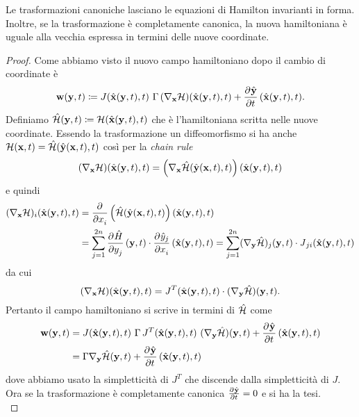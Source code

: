 \begin{thm}
    Le trasformazioni canoniche lasciano le equazioni di Hamilton invarianti in forma. Inoltre, se la trasformazione è completamente canonica, la nuova hamiltoniana è uguale alla vecchia espressa in termini delle nuove coordinate.
\end{thm}
\begin{proof}
    Come abbiamo visto il nuovo campo hamiltoniano dopo il cambio di coordinate è
    \[
        \vec{w}(\vec{y}, t) \coloneqq J(\hat{\vec{x}}(\vec{y}, t), t) \ \Gamma \, (\nabla_\vec{x} \ham)(\hat{\vec{x}}(\vec{y}, t), t) + \dpd{\hat{\vec{y}}}{t}(\hat{\vec{x}}(\vec{y}, t), t).
    \]
    Definiamo $ \hat{\mathcal{H}}(\mathbf{y}, t) \coloneqq \mathcal{H}(\hat{\mathbf{x}}(\mathbf{y}, t), t) $ che è l'hamiltoniana scritta nelle nuove coordinate. Essendo la trasformazione un diffeomorfismo si ha anche $ \mathcal{H}(\mathbf{x}, t) = \hat{\mathcal{H}}(\hat{\mathbf{y}}(\mathbf{x}, t), t) $ così per la \emph{chain rule}
    \[ (\nabla_{\mathbf{x}} \mathcal{H}) (\hat{\mathbf{x}}(\mathbf{y},t),t) = \left( \nabla_{\mathbf{x}} \hat{\mathcal{H}}(\hat{\mathbf{y}}(\mathbf{x},t),t) \right)(\hat{\mathbf{x}}(\mathbf{y},t),t) \]
    e quindi
    \begin{align*}
         (\nabla_{\vec{x}} \ham)_i (\hat{\vec{x}}(\vec{y},t),t) &= \dpd{}{x_i}\left( \hat{\ham}(\hat{\vec{y}}(\vec{x},t),t) \right)(\hat{\vec{x}}(\vec{y},t),t)
        \\ &=  \sum_{j=1}^{2n} \dpd{\hat{H}}{y_j} (\vec{y},t) \cdot \dpd{\hat{y}_j}{x_i} (\hat{\vec{x}}(\vec{y},t),t) =
        \sum_{j=1}^{2n} (\nabla_{\vec{y}}\hat{\ham})_j(\vec{y},t) \cdot \jac_{ji}(\hat{\vec{x}}(\vec{y},t),t)
    \end{align*}
    da cui
    \[ (\nabla_{\mathbf{x}} \mathcal{H}) (\hat{\mathbf{x}}(\mathbf{y},t),t) = \operatorname{\mathit{J}}^T(\hat{\mathbf{x}}(\mathbf{y},t),t) \cdot (\nabla_{\mathbf{y}}\hat{\mathcal{H}})(\mathbf{y},t). \]
    Pertanto il campo hamiltoniano si scrive in termini di $ \hat{\mathcal{H}} $ come
    \begin{align*}
        \vec{w}(\vec{y}, t) & = J(\hat{\vec{x}}(\vec{y}, t), t) \ \Gamma \, J^{T}(\hat{\vec{x}}(\vec{y}, t), t) \ (\nabla_\vec{y} \hat{\ham})(\vec{y}, t) + \dpd{\hat{\vec{y}}}{t}(\hat{\vec{x}}(\vec{y}, t), t) \\
        & = \Gamma \nabla_\vec{y} \hat{\ham}(\vec{y}, t) +  \dpd{\hat{\vec{y}}}{t}(\hat{\vec{x}}(\vec{y}, t), t)
    \end{align*}
    dove abbiamo usato la simpletticità di $ J^T $ che discende dalla simpletticità di $ J $. Ora se la trasformazione è completamente canonica $ \pd{\hat{\vec{y}}}{t} = 0 $ e si ha la tesi. \\

\end{proof}

